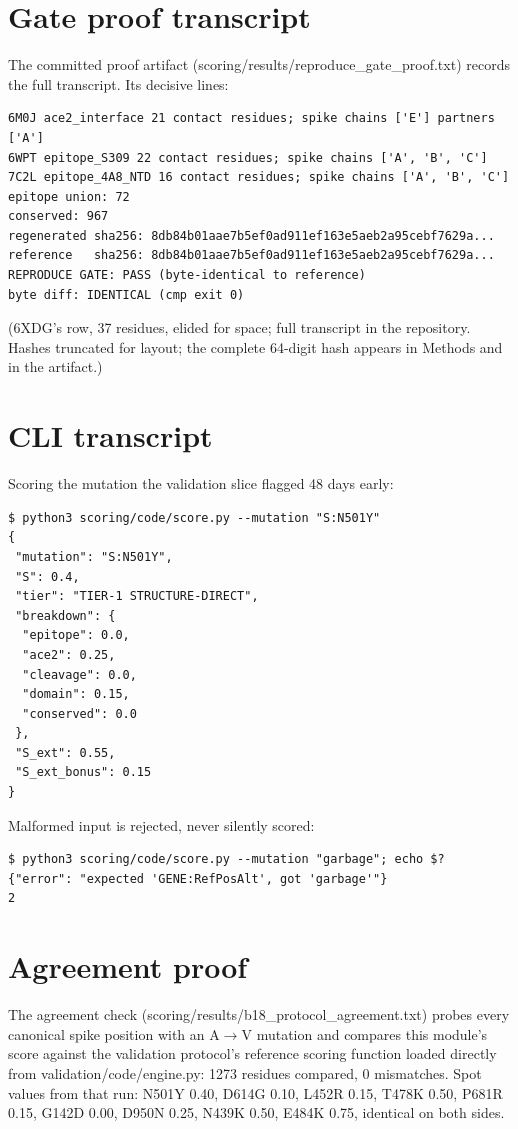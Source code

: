 \documentclass[11pt]{article}
\begin{document}
\clearpage
\small


\clearpage
\appendix
\section{Gate proof transcript}
The committed proof artifact (scoring/results/reproduce\_gate\_proof.txt) records the full transcript. Its decisive lines:
\begin{verbatim}
6M0J ace2_interface 21 contact residues; spike chains ['E'] partners ['A']
6WPT epitope_S309 22 contact residues; spike chains ['A', 'B', 'C']
7C2L epitope_4A8_NTD 16 contact residues; spike chains ['A', 'B', 'C']
epitope union: 72
conserved: 967
regenerated sha256: 8db84b01aae7b5ef0ad911ef163e5aeb2a95cebf7629a...
reference   sha256: 8db84b01aae7b5ef0ad911ef163e5aeb2a95cebf7629a...
REPRODUCE GATE: PASS (byte-identical to reference)
byte diff: IDENTICAL (cmp exit 0)
\end{verbatim}
(6XDG's row, 37 residues, elided for space; full transcript in the repository. Hashes truncated for layout; the complete 64-digit hash appears in Methods and in the artifact.)

\section{CLI transcript}
Scoring the mutation the validation slice flagged 48 days early:
\begin{verbatim}
$ python3 scoring/code/score.py --mutation "S:N501Y"
{
 "mutation": "S:N501Y",
 "S": 0.4,
 "tier": "TIER-1 STRUCTURE-DIRECT",
 "breakdown": {
  "epitope": 0.0,
  "ace2": 0.25,
  "cleavage": 0.0,
  "domain": 0.15,
  "conserved": 0.0
 },
 "S_ext": 0.55,
 "S_ext_bonus": 0.15
}
\end{verbatim}
Malformed input is rejected, never silently scored:
\begin{verbatim}
$ python3 scoring/code/score.py --mutation "garbage"; echo $?
{"error": "expected 'GENE:RefPosAlt', got 'garbage'"}
2
\end{verbatim}

\section{Agreement proof}
The agreement check (scoring/results/b18\_protocol\_agreement.txt) probes every canonical spike position with an A$\to$V mutation and compares this module's score against the validation protocol's reference scoring function loaded directly from validation/code/engine.py: 1273 residues compared, 0 mismatches. Spot values from that run: N501Y 0.40, D614G 0.10, L452R 0.15, T478K 0.50, P681R 0.15, G142D 0.00, D950N 0.25, N439K 0.50, E484K 0.75, identical on both sides.
\end{document}
